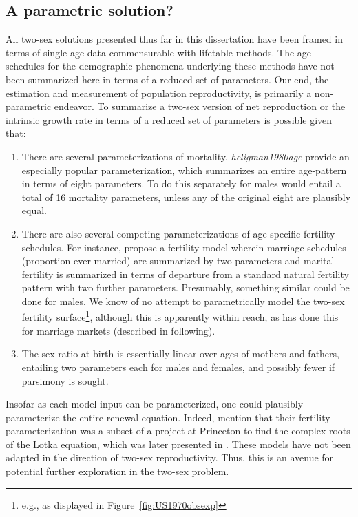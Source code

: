 \subsection{A parametric solution?} 
All two-sex solutions presented thus far in
this dissertation have been framed in terms of single-age data commensurable with lifetable
methods. The age schedules for the demographic phenomena underlying these
methods have not been summarized here in terms of a reduced set of parameters.
Our end, the estimation and measurement of population reproductivity, is primarily 
a non-parametric endeavor. To summarize a two-sex version of net reproduction or
the intrinsic growth rate in terms of a reduced set of parameters is
possible given that: 
\begin{enumerate}
  \item There are several parameterizations of mortality.
  \textit{heligman1980age} provide an especially popular parameterization, which 
  summarizes an entire age-pattern in terms of eight parameters. To do this
  separately for males would entail a total of 16 mortality parameters, unless
  any of the original eight are plausibly equal.
  \item There are also several competing parameterizations of age-specific
  fertility schedules. For instance, \citet{coale1974model} propose a fertility
  model wherein marriage schedules (proportion ever married) are summarized by
  two parameters and marital fertility is summarized in terms of departure from
  a standard natural fertility pattern with two further parameters. Presumably,
  something similar could be done for males. We know of no attempt to
  parametrically model the two-sex fertility surface\footnote{e.g., as displayed
  in Figure~\ref{fig:US1970obsexp}}, although this is apparently within reach,
  as \citet{marriage1981warren,
sanderson1983two} has done this for marriage markets (described in following).
  \item The sex ratio at birth is essentially linear over ages of mothers and
  fathers, entailing two parameters each for males and females, and possibly
  fewer if parsimony is sought.
\end{enumerate}

Insofar as each model input can be parameterized, one could plausibly
parameterize the entire renewal equation. Indeed, \citet{coale1974model} mention
that their fertility parameterization was a subset of a project at
Princeton to find the complex roots of the Lotka equation, which
was later presented in \citet{james1977determinants}. These models have not 
been adapted in the direction of two-sex reproductivity. Thus, this is an avenue
for potential further exploration in the two-sex problem.

